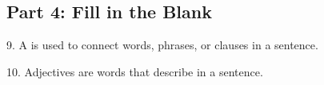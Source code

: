 \documentclass[12pt]{article}
\begin{document}
\vspace{1cm}

\subsection*{Part 4: Fill in the Blank}

9. A \underline{\hspace{4cm}} is used to connect words, phrases, or clauses in a sentence.

\vspace{3cm}

10. Adjectives are words that describe \underline{\hspace{4cm}} in a sentence.






\end{document}
